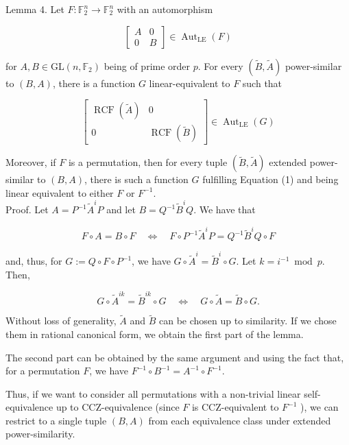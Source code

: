 \documentclass[10pt]{article}
\begin{document}
Lemma 4. Let $F: \mathbb{F}_{2}^{n} \rightarrow \mathbb{F}_{2}^{n}$ with an automorphism

$$
\left[\begin{array}{cc}
A & 0 \\
0 & B
\end{array}\right] \in \operatorname{Aut}_{\mathrm{LE}}(F)
$$

for $A, B \in \mathrm{GL}\left(n, \mathbb{F}_{2}\right)$ being of prime order $p$. For every $(\widetilde{B}, \widetilde{A})$ power-similar to $(B, A)$, there is a function $G$ linear-equivalent to $F$ such that

\[
\left[\begin{array}{cc}
\operatorname{RCF}(\widetilde{A}) & 0  \tag{1}\\
0 & \operatorname{RCF}(\widetilde{B})
\end{array}\right] \in \operatorname{Aut}_{\mathrm{LE}}(G)
\]

Moreover, if $F$ is a permutation, then for every tuple $(\widetilde{B}, \widetilde{A})$ extended power-similar to $(B, A)$, there is such a function $G$ fulfilling Equation (1) and being linear equivalent to either $F$ or $F^{-1}$.\\
Proof. Let $A=P^{-1} \widetilde{A}^{i} P$ and let $B=Q^{-1} \widetilde{B}^{i} Q$. We have that

$$
F \circ A=B \circ F \quad \Leftrightarrow \quad F \circ P^{-1} \widetilde{A}^{i} P=Q^{-1} \widetilde{B}^{i} Q \circ F
$$

and, thus, for $G:=Q \circ F \circ P^{-1}$, we have $G \circ \widetilde{A}^{i}=\widetilde{B}^{i} \circ G$. Let $k=i^{-1} \bmod p$. Then,

$$
G \circ \widetilde{A}^{i k}=\widetilde{B}^{i k} \circ G \quad \Leftrightarrow \quad G \circ \widetilde{A}=\widetilde{B} \circ G .
$$

Without loss of generality, $\widetilde{A}$ and $\widetilde{B}$ can be chosen up to similarity. If we chose them in rational canonical form, we obtain the first part of the lemma.

The second part can be obtained by the same argument and using the fact that, for a permutation $F$, we have $F^{-1} \circ B^{-1}=A^{-1} \circ F^{-1}$.

Thus, if we want to consider all permutations with a non-trivial linear self-equivalence up to CCZ-equivalence (since $F$ is CCZ-equivalent to $F^{-1}$ ), we can restrict to a single tuple $(B, A)$ from each equivalence class under extended power-similarity.
\end{document}
